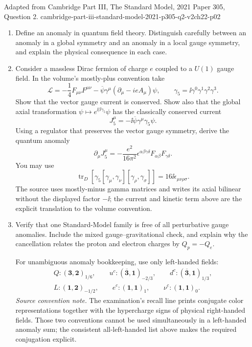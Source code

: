 \begin{enumerate}
  {Adapted from Cambridge Part III, The Standard Model, 2021 Paper 305,
  Question 2.}
  {cambridge-part-iii-standard-model-2021-p305-q2-v2ch22-p02}
  \begin{enumerate}
    \item[(a)]
    Define an anomaly in quantum field theory.  Distinguish carefully
    between an anomaly in a global symmetry and an anomaly in a local
    gauge symmetry, and explain the physical consequence in each case.
    \item[(b)]
    Consider a massless Dirac fermion of charge \(e\) coupled to a
    \(U(1)\) gauge field.  In the volume's mostly-plus convention take
    \[
      \mathcal L=-\frac14F_{\mu\nu}F^{\mu\nu}
        -\overline\psi\gamma^\mu(\partial_\mu-ieA_\mu)\psi,
      \qquad
      \gamma_5=\ii\gamma^0\gamma^1\gamma^2\gamma^3 .
    \]
    Show that the vector gauge current is conserved.  Show also that the
    global axial transformation
    \(\psi\mapsto e^{\ii\beta\gamma_5}\psi\) has the classically conserved
    current
    \[
      J_5^\mu=-\ii\overline\psi\gamma^\mu\gamma_5\psi .
    \]
    Using a regulator that preserves the vector gauge symmetry, derive the
    quantum anomaly
    \[
      \boxed{\partial_\mu J_5^\mu
        =-\frac{e^2}{16\pi^2}
          \epsilon^{\alpha\beta\gamma\delta}
          F_{\alpha\beta}F_{\gamma\delta}.}
    \]
    You may use
    \[
      \operatorname{tr}_{D}\!\left[
        \gamma_5[\gamma_\mu,\gamma_\nu]
        [\gamma_\rho,\gamma_\sigma]\right]
        =16\ii\epsilon_{\mu\nu\rho\sigma}.
    \]
    The source uses mostly-minus gamma matrices and writes its axial
    bilinear without the displayed factor \(-\ii\); the current and kinetic
    term above are the explicit translation to the volume convention.
    \item[(c)]
    Verify that one Standard-Model family is free of all perturbative gauge
    anomalies.  Include the mixed gauge--gravitational check, and explain
    why the cancellation relates the proton and electron charges by
    \(Q_p=-Q_e\).

    For unambiguous anomaly bookkeeping, use only left-handed fields:
    \[
    \begin{gathered}
      Q:(\mathbf3,\mathbf2)_{1/6},\qquad
      u^c:(\overline{\mathbf3},\mathbf1)_{-2/3},\qquad
      d^c:(\overline{\mathbf3},\mathbf1)_{1/3},\\
      L:(\mathbf1,\mathbf2)_{-1/2},\qquad
      e^c:(\mathbf1,\mathbf1)_1,\qquad
      \nu^c:(\mathbf1,\mathbf1)_0 .
    \end{gathered}
    \]
    \emph{Source convention note.}  The examination's recall line prints
    conjugate color representations together with the hypercharge signs of
    physical right-handed fields.  Those two conventions cannot be used
    simultaneously in a left-handed anomaly sum; the consistent
    all-left-handed list above makes the required conjugation explicit.
  \end{enumerate}


\end{enumerate}
